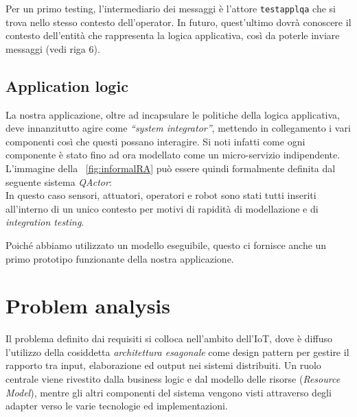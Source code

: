 \documentclass{../llncs}
\newcommand{\codescript}[1]{{\mbox{\small{\texttt{#1}}}}\xspace}
\newcommand{\qa}{\textsf{\textit{QActor}}}
\newcommand{\labelsec}[1]{\label{sec:#1}}
\newcommand{\xf}[1]{\figurename~\ref{fig:#1}}
\begin{document}


Per un primo testing, l'intermediario dei messaggi è l'attore \codescript{testapplqa} che si trova nello stesso contesto dell'operator. In futuro, quest'ultimo dovrà conoscere il contesto dell'entità che rappresenta la logica applicativa, così da poterle inviare messaggi (vedi riga 6).

\subsection{Application logic}
La nostra applicazione, oltre ad incapsulare le politiche della logica applicativa, deve innanzitutto agire come \textit{``system integrator''}, mettendo in collegamento i vari componenti così che questi possano interagire.
Si noti infatti come ogni componente è stato fino ad ora modellato come un micro-servizio indipendente.\\

L'immagine della \xf{informalRA} può essere quindi formalmente definita dal seguente sistema {\qa}:\\



In questo caso sensori, attuatori, operatori e robot sono stati tutti inseriti all'interno di un unico contesto per motivi di rapidità di modellazione e di \textit{integration testing}.

\vspace{8px}

Poiché abbiamo utilizzato un modello eseguibile, questo ci fornisce anche un primo prototipo funzionante della nostra applicazione.

\section{Problem analysis}
\labelsec{ProblemAnalysis}
Il problema definito dai requisiti si colloca nell'ambito dell'IoT, dove è diffuso l'utilizzo della cosiddetta \emph{architettura esagonale} come design pattern per gestire il rapporto tra input, elaborazione ed output nei sistemi distribuiti. Un ruolo centrale viene rivestito dalla business logic e dal modello delle risorse (\emph{Resource Model}), mentre gli altri componenti del sistema vengono visti attraverso degli adapter verso le varie tecnologie ed implementazioni.\\
\end{document}
